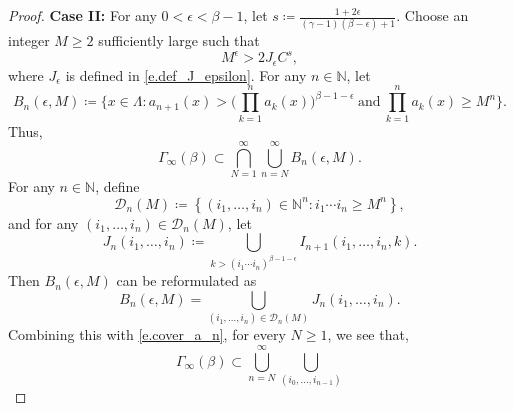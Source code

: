 \documentclass[12pt,reqno]{amsart}
\renewcommand{\=}{\coloneqq}
\theoremstyle{plain}
\begin{document}
\begin{proof}
 \textbf{Case II: } For any $0<\epsilon<\beta-1$, let $s\coloneqq \frac{1+2\epsilon}{(\gamma-1)(\beta-\epsilon)+1}$. Choose an integer $M\geq 2$ sufficiently large such that
        \begin{equation}\label{e.def_M}
                M^{\epsilon}> 2J_{\epsilon}C^s,
        \end{equation}
        where $J_{\epsilon}$ is defined in \eqref{e.def_J_epsilon}.
For any $n \in \mathbb N$, let
        \begin{equation}\label{e.def_B_n_ep_M}
                B_n(\epsilon,M)\coloneqq
                \Big\{
                x\in  \Lambda:
                a_{n+1}(x)>\big(
                        \prod_{k=1}^{n}
                        a_k(x)
                        \big)^{\beta-1-\epsilon}\ \text{and}\
                \prod_{k=1}^{n}
                a_k(x)\geq M^n
                \Big\}.
                \end{equation}
   Thus,
        \begin{equation}\label{e.cover_a_n}
                {\Gamma}_{\infty}(\beta)
                \subset \bigcap_{N=1}^{\infty}
                \bigcup_{n=N}^{\infty}
                B_n(\epsilon,M).
        \end{equation}
For any $n \in \mathbb N$, define
        \begin{equation}\label{e.def_D_n}
            \mathcal{D} _n(M)\coloneqq
        \left\{(i_1,\dots, i_{n})\in
        \mathbb{N}^n:
        i_1\cdots i_{n}\geq M^n\right\},
        \end{equation}
 and for any $(i_1,\dots, i_{n})
        \in \mathcal{D} _n(M)$, let
        \begin{equation}\label{e.def_J_n_another}
                J_n(i_1,\dots,i_{n}) \coloneqq
                \bigcup_{k>(i_1\cdots i_{n})
                ^{\beta-1-\epsilon}} I_{n+1}(i_1,\dots,i_{n},k).
        \end{equation}
Then $B_n(\epsilon,M)$ can be reformulated as
        \begin{equation}\label{e.a_n_J_n}
                B_n(\epsilon,M)=
                \bigcup_{(i_1,\dots, i_{n})
                \in \mathcal{D} _n(M)}
                J_n(i_1,\dots,i_{n}).
        \end{equation}
 Combining this with \eqref{e.cover_a_n}, for every $N\geq 1$, we see that,
        \begin{equation}\label{e.cover_by_J}
                {\Gamma}_{\infty}(\beta)\subset
                \bigcup^\infty_{n=N}\bigcup_{(i_0,\dots, i_{n-1})
}
\end{equation}
\end{proof}
\end{document}
